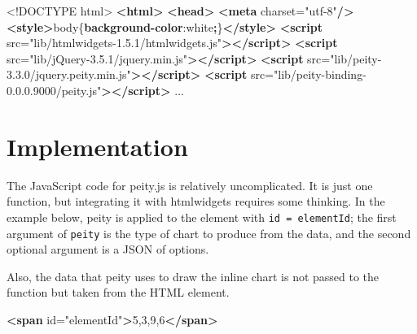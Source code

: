 \documentclass[10pt,]{krantz}
\makeatletter
\newenvironment{Shaded}{\begin{snugshade}}{\end{snugshade}}
\newcommand{\AttributeTok}[1]{\textcolor[rgb]{0.61,0.61,0.61}{#1}}
\newcommand{\ConstantTok}[1]{\textcolor[rgb]{0,0,0}{#1}}
\newcommand{\DataTypeTok}[1]{\textcolor[rgb]{0.27,0.27,0.27}{#1}}
\newcommand{\KeywordTok}[1]{\textcolor[rgb]{0.27,0.27,0.27}{\textbf{#1}}}
\newcommand{\NormalTok}[1]{#1}
\newcommand{\OperatorTok}[1]{\textcolor[rgb]{0.43,0.43,0.43}{\textbf{#1}}}
\newcommand{\OtherTok}[1]{\textcolor[rgb]{0.37,0.37,0.37}{#1}}
\newcommand{\StringTok}[1]{\textcolor[rgb]{0.5,0.5,0.5}{#1}}
\newenvironment{kframe}{%
\medskip{}
\setlength{\fboxsep}{.8em}
 \def\at@end@of@kframe{}%
 \ifinner\ifhmode%
  \def\at@end@of@kframe{\end{minipage}}%
  \begin{minipage}{\columnwidth}%
 \fi\fi%
 \def\FrameCommand##1{\hskip\@totalleftmargin \hskip-\fboxsep
 \colorbox{shadecolor}{##1}\hskip-\fboxsep
     \hskip-\linewidth \hskip-\@totalleftmargin \hskip\columnwidth}%
 \MakeFramed {\advance\hsize-\width
   \@totalleftmargin\z@ \linewidth\hsize
   \@setminipage}}%
 {\par\unskip\endMakeFramed%
 \at@end@of@kframe}
\renewenvironment{Shaded}{\begin{kframe}}{\end{kframe}}
\makeatother
\begin{document}
\begin{Shaded}
\begin{Highlighting}[]
\DataTypeTok{<!DOCTYPE }\NormalTok{html}\DataTypeTok{>}
\KeywordTok{<html>}
\KeywordTok{<head>}
\KeywordTok{<meta}\OtherTok{ charset=}\StringTok{"utf-8"}\KeywordTok{/>}
\KeywordTok{<style>}\NormalTok{body\{}\KeywordTok{background-color}\NormalTok{:}\ConstantTok{white}\OperatorTok{;}\NormalTok{\}}\KeywordTok{</style>}
\KeywordTok{<script}\OtherTok{ src=}\StringTok{"lib/htmlwidgets-1.5.1/htmlwidgets.js"}\KeywordTok{></script>}
\KeywordTok{<script}\OtherTok{ src=}\StringTok{"lib/jQuery-3.5.1/jquery.min.js"}\KeywordTok{></script>}
\KeywordTok{<script}\OtherTok{ src=}\StringTok{"lib/peity-3.3.0/jquery.peity.min.js"}\KeywordTok{></script>}
\KeywordTok{<script}\OtherTok{ src=}\StringTok{"lib/peity-binding-0.0.0.9000/peity.js"}\KeywordTok{></script>}
\NormalTok{...}
\end{Highlighting}
\end{Shaded}

\hypertarget{widgets-realistic-implementation}{%
\section{Implementation}\label{widgets-realistic-implementation}}

The JavaScript code for peity.js is relatively uncomplicated. It is just one function, but integrating it with htmlwidgets requires some thinking. In the example below, peity is applied to the element with \texttt{id\ =\ \textquotesingle{}elementId\textquotesingle{}}; the first argument of \texttt{peity} is the type of chart to produce from the data, and the second optional argument is a JSON of options.

\begin{Shaded}
\end{Shaded}

Also, the data that peity uses to draw the inline chart is not passed to the function but taken from the HTML element.

\begin{Shaded}
\begin{Highlighting}[]
\KeywordTok{<span}\OtherTok{ id=}\StringTok{"elementId"}\KeywordTok{>}\NormalTok{5,3,9,6}\KeywordTok{</span>}
\end{Highlighting}
\end{Shaded}
\end{document}
